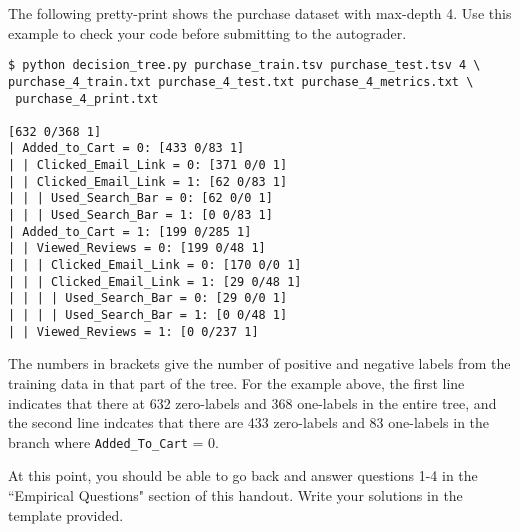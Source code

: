 \documentclass[11pt,addpoints,answers]{exam}
\begin{document}
The following pretty-print shows the purchase dataset with max-depth 4.  Use this example to check your code before submitting to the autograder.  

\begin{lstlisting}[language=Shell]
$ python decision_tree.py purchase_train.tsv purchase_test.tsv 4 \
purchase_4_train.txt purchase_4_test.txt purchase_4_metrics.txt \
 purchase_4_print.txt

[632 0/368 1]
| Added_to_Cart = 0: [433 0/83 1]
| | Clicked_Email_Link = 0: [371 0/0 1]
| | Clicked_Email_Link = 1: [62 0/83 1]
| | | Used_Search_Bar = 0: [62 0/0 1]
| | | Used_Search_Bar = 1: [0 0/83 1]
| Added_to_Cart = 1: [199 0/285 1]
| | Viewed_Reviews = 0: [199 0/48 1]
| | | Clicked_Email_Link = 0: [170 0/0 1]
| | | Clicked_Email_Link = 1: [29 0/48 1]
| | | | Used_Search_Bar = 0: [29 0/0 1]
| | | | Used_Search_Bar = 1: [0 0/48 1]
| | Viewed_Reviews = 1: [0 0/237 1]
\end{lstlisting}

The numbers in brackets give the number of positive and negative labels from the training data in that part of the tree. For the example above, the first line indicates that there at 632 zero-labels and 368 one-labels in the entire tree, and the second line indcates that there are 433 zero-labels and 83 one-labels in the branch where \texttt{Added\_To\_Cart} = 0.

\begin{notebox}
At this point, you should be able to go back and answer questions 1-4 in the ``Empirical Questions" section of this handout.  Write your solutions in the template provided. \end{notebox}
\end{document}
